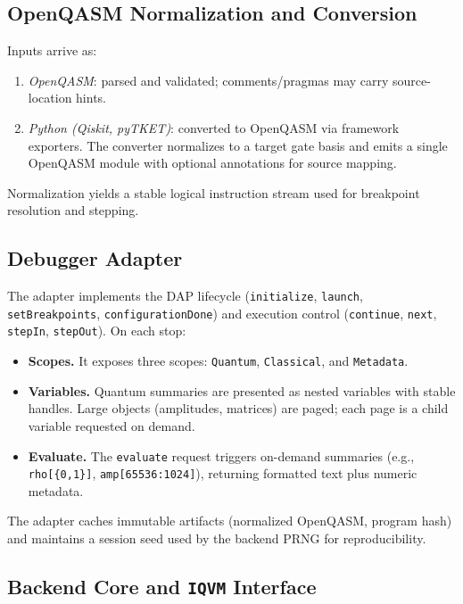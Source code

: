 \documentclass[12pt]{article}
\begin{document}
\begin{itemize}
\subsection{OpenQASM Normalization and Conversion}

Inputs arrive as:
\begin{enumerate}
  \item \emph{OpenQASM}: parsed and validated; comments/pragmas may carry source-location hints.
  \item \emph{Python (Qiskit, pyTKET)}: converted to OpenQASM via framework exporters. The converter normalizes to a target gate basis and emits a single OpenQASM module with optional annotations for source mapping.
\end{enumerate}
Normalization yields a stable logical instruction stream used for breakpoint resolution and stepping.

\subsection{Debugger Adapter}

The adapter implements the DAP lifecycle (\texttt{initialize}, \texttt{launch}, \texttt{setBreakpoints}, \texttt{configurationDone}) and execution control (\texttt{continue}, \texttt{next}, \texttt{stepIn}, \texttt{stepOut}). On each stop:

\begin{itemize}
  \item \textbf{Scopes.} It exposes three scopes: \texttt{Quantum}, \texttt{Classical}, and \texttt{Metadata}.
  \item \textbf{Variables.} Quantum summaries are presented as nested variables with stable handles. Large objects (amplitudes, matrices) are paged; each page is a child variable requested on demand.
  \item \textbf{Evaluate.} The \texttt{evaluate} request triggers on-demand summaries (e.g., \texttt{rho[\{0,1\}]}, \texttt{amp[65536:1024]}), returning formatted text plus numeric metadata.
\end{itemize}

The adapter caches immutable artifacts (normalized OpenQASM, program hash) and maintains a session seed used by the backend PRNG for reproducibility.

\subsection{Backend Core and \texttt{IQVM} Interface}


\end{itemize}
\end{document}
